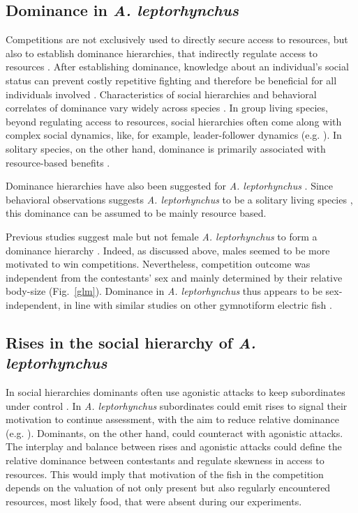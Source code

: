 \documentclass[vruler,JEB]{COB}%
\newcommand{\lepto}{\textit{A. leptorhynchus}}
\newcommand{\fref}[1]{\textup{\ref{#1}}}
\newcommand{\Figb}{Fig.}
\newcommand{\Figrefb}[1]{\Figb~\fref{#1}}
\begin{document}
\subsection{Dominance in \lepto{}}

Competitions are not exclusively used to directly secure access to resources, but also to establish dominance hierarchies, that indirectly regulate access to resources \citep{Wauters1992, Sapolsky2005, Taves2009}. After establishing dominance, knowledge about an individual's social status can prevent costly repetitive fighting and therefore be beneficial for all individuals involved \citep{Fernald2014, Huyghe2005}. Characteristics of social hierarchies and behavioral correlates of dominance vary widely across species \citep{Cluttonbrock1979, Cigliano1993, Sapolsky2005}. In group living species, beyond regulating access to resources, social hierarchies often come along with complex social dynamics, like, for example, leader-follower dynamics (e.g. \citealp{Strandburg2018, Jason1990}). In solitary species, on the other hand, dominance is primarily associated with resource-based benefits \citep{Cigliano1993}. 

Dominance hierarchies have also been suggested for \lepto{} \citep{Hagedorn1985, Dunlap2002}. Since behavioral observations suggests \lepto{} to be a solitary living species \citep{Stamper2010, Raab2019, Henninger2020}, this dominance can be assumed to be mainly resource based.

Previous studies suggest male but not female \lepto{} to form a dominance hierarchy \citep{Hagedorn1985, Dunlap2002}. Indeed, as discussed above, males seemed to be more motivated to win competitions. Nevertheless, competition outcome was independent from the contestants' sex and mainly determined by their relative body-size (\Figrefb{glm}). Dominance in \lepto{} thus appears to be sex-independent, in line with similar studies on other gymnotiform electric fish \citep{Silva2012, Zubizarreta2020}.

\subsection{Rises in the social hierarchy of \lepto{}}

In social hierarchies dominants often use agonistic attacks to keep subordinates under control \citep{Cluttonbrock1979, Creel1996, Janson1985}. In \lepto{} subordinates could emit rises to signal their motivation to continue assessment, with the aim to reduce relative dominance (e.g. \citealp{Kareklas2019}). Dominants, on the other hand, could counteract with agonistic attacks. The interplay and balance between rises and agonistic attacks could define the relative dominance between contestants and regulate skewness in access to resources. This would imply that motivation of the fish in the competition depends on the valuation of not only present but also regularly encountered resources, most likely food, that were absent during our experiments. 
\end{document}
